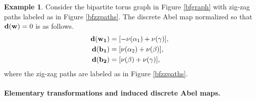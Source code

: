 \documentclass[11pt]{article} %
\theoremstyle{definition}
\newtheorem{example}[theorem]{Example}
\begin{document}
\begin{example} Consider the bipartite torus graph in Figure \ref{bfgraph} with zig-zag paths labeled as in Figure \ref{bfzzpaths}. The discrete Abel map normalized so that ${\bf d}({\bf w})=0$ is as follows.
\begin{align*}
    {\bf d}({\bf w_1})&=[-\nu(\alpha_1)+\nu(\gamma)],\\
     {\bf d}({\bf b_1})&=[\nu(\alpha_2)+\nu(\beta)],\\
     {\bf d}({\bf b_2})&=[\nu(\beta)+\nu(\gamma)],
\end{align*}
where the zig-zag paths are labeled as in Figure \ref{bfzzpaths}.
\end{example}


\paragraph{Elementary transformations and induced discrete Abel maps.}
\end{document}
